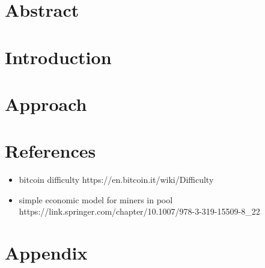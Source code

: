 



\nocite{*} %

\maketitle

\thispagestyle{empty}

\newpage

\setcounter{page}{1}

\section{Abstract}



\section{Introduction}



\section{Approach}



\newpage

\section{References}

\begin{itemize}
  \item bitcoin difficulty https://en.bitcoin.it/wiki/Difficulty
  \item simple economic model for miners in pool https://link.springer.com/chapter/10.1007/978-3-319-15509-8\_22
\end{itemize}

\printbibliography[heading=none]

\section{Appendix}


